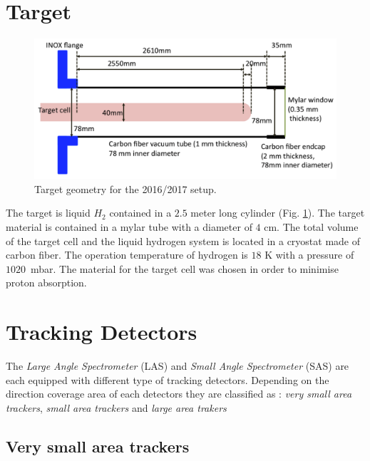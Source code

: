 
\section{Target}

\begin{figure}[!h]
  \centering
	\includegraphics[scale=0.3]{./gfx/Target.png}
	\caption{Target geometry for the 2016/2017 setup.}
	\label{pic:Target}
\end{figure}

The target is liquid $H_2$ contained in a $2.5$ meter long cylinder (Fig. \ref{pic:Target}). The target material is contained in a mylar tube with a diameter of $4$ cm. The total volume of the target cell and the liquid hydrogen system is located in a cryostat made of carbon fiber. The operation temperature of hydrogen is $18$ K with a pressure of $1020$~mbar. The material for the target cell was chosen in order to minimise proton absorption.


\section{Tracking Detectors}\label{sec:track}

The \textit{Large Angle Spectrometer} (LAS) and \textit{Small Angle Spectrometer} (SAS) are each equipped with different type of tracking detectors. Depending on the direction coverage area of each detectors they are classified as :
\textit{very small area trackers}, \textit{small area trackers} and \textit{large area trakers}

\subsection{Very small area trackers}


